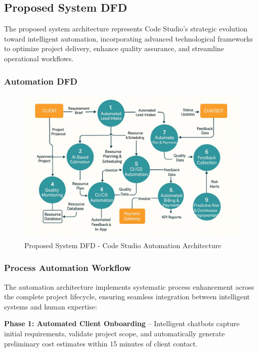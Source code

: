 \documentclass[12pt,a4paper]{article}
\begin{document}
\subsection{Proposed System DFD}

The proposed system architecture represents Code Studio's strategic evolution toward intelligent automation, incorporating advanced technological frameworks to optimize project delivery, enhance quality assurance, and streamline operational workflows.

\subsubsection{Automation DFD}

\begin{figure}[H]
  \centering
  \includegraphics[width=0.95\linewidth]{dfd2.jpeg}
  \caption{Proposed System DFD - Code Studio Automation Architecture}
\end{figure}

\subsubsection{Process Automation Workflow}

The automation architecture implements systematic process enhancement across the complete project lifecycle, ensuring seamless integration between intelligent systems and human expertise:

\textbf{Phase 1: Automated Client Onboarding} – Intelligent chatbots capture initial requirements, validate project scope, and automatically generate preliminary cost estimates within 15 minutes of client contact.
\end{document}
